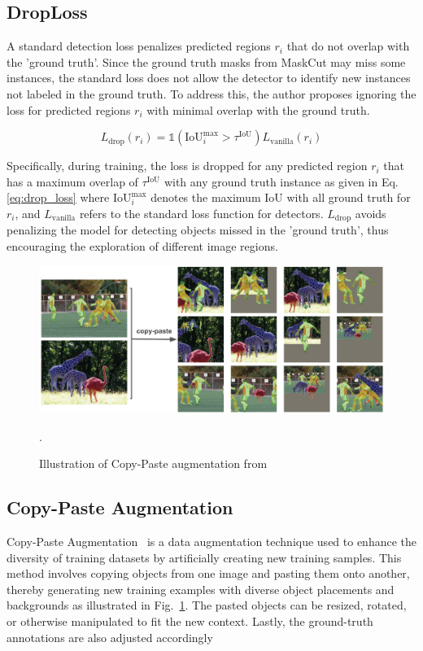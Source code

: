 \subsection{DropLoss}
A standard detection loss penalizes predicted regions \( r_i \) that do not overlap with the 'ground truth'. Since the ground truth masks from MaskCut may miss some instances, the standard loss does not allow the detector to identify new instances not labeled in the ground truth. To address this, the author proposes ignoring the loss for predicted regions \( r_i \) with minimal overlap with the ground truth.

\begin{equation}
	\label{eq:drop_loss}
L_{\text{drop}}(r_i) = \mathds{1}(\text{IoU}_i^{\text{max}} > \tau^{\text{IoU}}) L_{\text{vanilla}}(r_i)
\end{equation}

Specifically, during training, the loss is dropped for any predicted region \( r_i \) that has a maximum overlap of \( \tau^{\text{IoU}} \) with any ground truth instance as given in Eq. \ref{eq:drop_loss} where \(\text{IoU}_i^{\text{max}}\) denotes the maximum IoU with all ground truth for \( r_i \), and \( L_{\text{vanilla}} \) refers to the standard loss function for detectors. \( L_{\text{drop}} \) avoids penalizing the model for detecting objects missed in the 'ground truth', thus encouraging the exploration of different image regions.

\begin{figure}
	\centering
	\includegraphics[width=1.0\textwidth]{Images/main/copy-paste.png}
	\caption[\textbf{Copy-Paste Augmentation}]{Illustration of Copy-Paste augmentation from~\cite{ghiasi2021simplecopypastestrongdata}}.
	\label{fig:copy_paste_aug}
\end{figure}

\subsection{Copy-Paste Augmentation}
Copy-Paste Augmentation~\cite{ghiasi2021simplecopypastestrongdata} is a data augmentation technique used to enhance the diversity of training datasets by artificially creating new training samples. This method involves copying objects from one image and pasting them onto another, thereby generating new training examples with diverse object placements and backgrounds as illustrated in Fig.~\ref{fig:copy_paste_aug}. The pasted objects can be resized, rotated, or otherwise manipulated to fit the new context. Lastly, the ground-truth annotations are also adjusted accordingly

